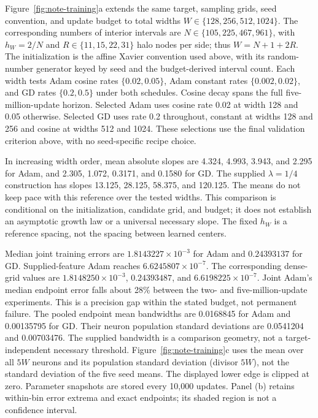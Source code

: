 Figure~\ref{fig:note-training}a extends the same target, sampling grids,
seed convention, and update budget to total widths
$W\in\{128,256,512,1024\}$. The corresponding numbers of interior
intervals are $N\in\{105,225,467,961\}$, with $h_W=2/N$ and
$R\in\{11,15,22,31\}$ halo nodes per side; thus $W=N+1+2R$.
The initialization is the affine Xavier convention used above, with its
random-number generator keyed by seed and the budget-derived interval count.
Each width tests Adam cosine rates $\{0.02,0.05\}$, Adam constant rates
$\{0.002,0.02\}$, and GD rates $\{0.2,0.5\}$ under both schedules.
Cosine decay spans the full five-million-update horizon.
Selected Adam uses cosine rate 0.02 at width 128 and 0.05 otherwise.
Selected GD uses rate 0.2 throughout, constant at widths 128 and 256 and
cosine at widths 512 and 1024. These selections use the final validation
criterion above, with no seed-specific recipe choice.

In increasing width order, mean absolute slopes are
4.324, 4.993, 3.943, and 2.295 for Adam, and
2.305, 1.072, 0.3171, and 0.1580 for GD. The supplied $\lambda=1/4$
construction has slopes 13.125, 28.125, 58.375, and 120.125.
The means do not keep pace with this reference over the tested widths.
This comparison is conditional on the initialization, candidate grid,
and budget; it does not establish an asymptotic growth law or a universal
necessary slope. The fixed $h_W$ is a reference spacing, not the spacing
between learned centers.

Median joint training errors are $1.8143227\times10^{-3}$ for Adam and
$0.24393137$ for GD. Supplied-feature Adam reaches $6.6245807\times10^{-7}$.
The corresponding dense-grid values are $1.8148250\times10^{-3}$,
$0.24393487$, and $6.6198225\times10^{-7}$.
Joint Adam's median endpoint error falls about 28\% between the two- and
five-million-update experiments. This is a precision gap within the stated
budget, not permanent failure.
The pooled endpoint mean bandwidths are 0.0168845 for Adam and 0.00135795
for GD. Their neuron population standard deviations are 0.0541204 and
0.00703476. The supplied bandwidth is a comparison geometry, not a
target-independent necessary threshold. Figure~\ref{fig:note-training}c
uses the mean over all $5W$ neurons and its population standard deviation
(divisor $5W$), not the standard deviation of the five seed means.
The displayed lower edge is clipped at zero. Parameter snapshots are
stored every 10,000 updates. Panel (b) retains within-bin error extrema
and exact endpoints; its shaded region is not a confidence interval.

